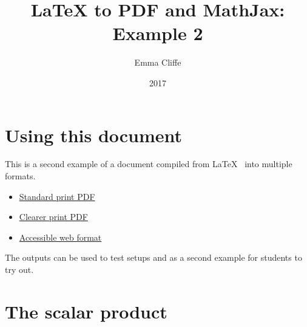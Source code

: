 \documentclass[12pt,a4paper]{article}
\title{LaTeX to PDF and MathJax: Example 2}
\author{Emma Cliffe}
\date{2017}
\theoremstyle{clearprint}
\begin{document}
\maketitle

\tableofcontents
\listoffigures
\newpage

\setcounter{page}{1}

\section*{Using this document}

This is a second example of a document compiled from \LaTeX~ into multiple formats. 
\begin{itemize} 
\item \href{https://stem-enable.github.io/LaTeXtoPDFandMathJax-Example2/LaTeXtoPDFandMathJax-2-standard.pdf}{Standard print PDF}
\item \href{https://stem-enable.github.io/LaTeXtoPDFandMathJax-Example2/LaTeXtoPDFandMathJax-2-clear.pdf}{Clearer print PDF}
\item \href{https://stem-enable.github.io/LaTeXtoPDFandMathJax-Example2/}{Accessible web format}
\end{itemize}

The outputs can be used to test setups and as a second example for students to try out. 

\newpage
\section{The scalar product}
\end{document}
